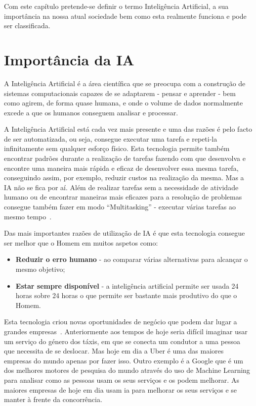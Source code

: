 \documentclass{report}
\begin{document}

 Com este capítulo pretende-se definir o termo Inteligência Artificial, a sua importância na nossa atual sociedade bem como esta realmente funciona e pode ser classificada.


\section{Importância da IA}
\label{sec.importancia}
A Inteligência Artificial é a área científica que se preocupa com a construção de sistemas computacionais capazes de se adaptarem  - pensar e aprender - bem como agirem, de forma quase humana, e onde o volume de dados normalmente excede a que os humanos conseguem analisar e processar.

A Inteligência Artificial está cada vez mais presente e uma das razões é pelo facto de ser automatizada, ou seja, consegue executar uma tarefa e repeti-la infinitamente sem qualquer esforço físico. Esta tecnologia permite também encontrar padrões durante a realização de tarefas fazendo com que desenvolva e encontre uma maneira mais rápida e eficaz de desenvolver essa mesma tarefa, conseguindo assim, por exemplo, reduzir custos na realização da mesma. Mas a IA não se fica por aí. Além de realizar tarefas sem a necessidade de atividade humano ou de encontrar maneiras mais eficazes para a resolução de problemas consegue também fazer em modo ``Multitasking'' - executar várias tarefas ao mesmo tempo~\cite{CSU:2021}.

Das mais importantes razões de utilização de IA é que esta tecnologia consegue ser melhor que o Homem em muitos aspetos como:

\begin{itemize}
    \item \textbf{Reduzir o erro humano} - ao comparar várias alternativas para alcançar o mesmo objetivo;
    
    \item \textbf{Estar sempre disponível} - a inteligência artificial permite ser usada 24 horas sobre 24 horas o que permite ser bastante mais produtivo do que o Homem.
\end{itemize}

Esta tecnologia criou novas oportunidades de negócio que podem dar lugar a grandes empresas~\cite{NgLeungChuQiao:2021}.
Anteriormente aos tempos de hoje seria difícil imaginar usar um serviço do género dos táxis, em que se conecta um condutor a uma pessoa que necessita de se deslocar. Mas hoje em dia a Uber é uma das maiores empresas do mundo apenas por fazer isso. Outro exemplo é a Google que é um dos melhores motores de pesquisa do mundo através do uso de Machine Learning para analisar como as pessoas usam os seus serviços e os podem melhorar.
As maiores empresas de hoje em dia usam \ac{ia} para melhorar os seus serviços e se manter à frente da concorrência.
\end{document}

